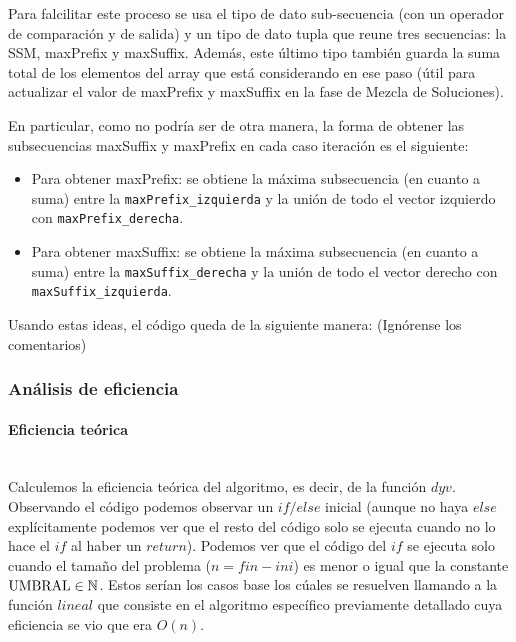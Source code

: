 \documentclass{article}
\newcommand{\myparagraph}[1]{\paragraph{#1}\mbox{}\\}
\newcommand\N{\ensuremath{\mathbb N}\space}
\begin{document}
Para falcilitar este proceso se usa el tipo de dato sub-secuencia
(con un operador de comparación y de salida) y un tipo de dato
tupla que reune tres secuencias: la SSM, maxPrefix y maxSuffix.
Además, este último tipo también guarda la suma total de los elementos del array que está considerando en ese paso (útil para 
actualizar el valor de maxPrefix y maxSuffix en la fase de
Mezcla de Soluciones).




En particular, como no podría ser de otra manera, la forma de
obtener las subsecuencias maxSuffix y maxPrefix en cada caso
iteración es el siguiente:
\begin{itemize}
    \item Para obtener maxPrefix: se obtiene la máxima subsecuencia (en cuanto a suma) entre la \verb+maxPrefix_izquierda+ y la unión de todo el vector izquierdo con \verb+maxPrefix_derecha+.
    \item Para obtener maxSuffix: se obtiene la máxima subsecuencia (en cuanto a suma) entre la \verb+maxSuffix_derecha+ y la unión de todo el vector derecho con \verb+maxSuffix_izquierda+.
\end{itemize}

Usando estas ideas, el código queda de la siguiente manera:
(Ignórense los comentarios)





\subsubsection{Análisis de eficiencia} %

\myparagraph{Eficiencia teórica}

Calculemos la eficiencia teórica del algoritmo, es decir, de la función $dyv$.\\




Observando el código podemos observar un $if/else$ inicial (aunque no haya $else$ explícitamente podemos ver que el resto del código solo se ejecuta cuando no lo hace el $if$ al haber un $return$). Podemos ver que el código del $if$ se ejecuta solo cuando el tamaño del problema ($n = fin - ini$) es menor o igual que la constante $\text{UMBRAL}\in \N$. Estos serían los casos base los cúales se resuelven llamando a la función $lineal$ que consiste en el algoritmo específico previamente detallado cuya eficiencia se vio que era $O(n)$.\\
\end{document}
